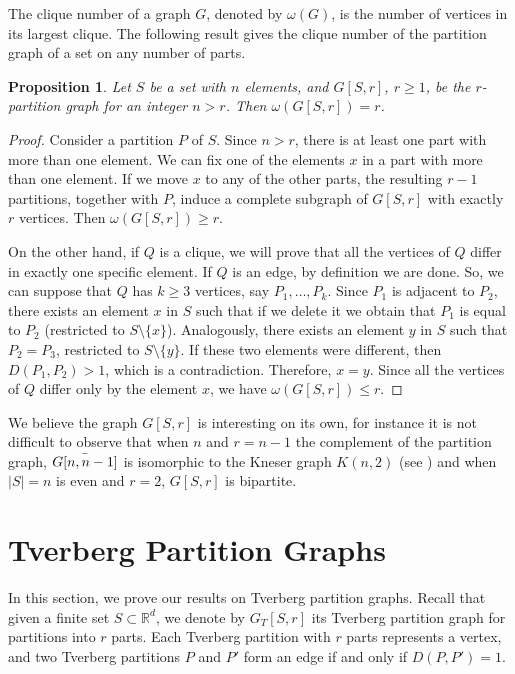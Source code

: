 \documentclass[11pt,a4paper]{article}
\theoremstyle{plain}
\newtheorem{proposition}{Proposition}
\theoremstyle{definition}
\newcommand{\rr}{\mathds{R}}
\begin{document}
The clique number of a graph $G$, denoted by $\omega(G)$, is the number of vertices in its largest clique. The following result gives the clique number of the partition graph of a set on any number of parts.

\begin{proposition}\label{cliquepartitiongraph}
Let $S$ be a set with $n$ elements, and $G[S,r]$, $r\geq 1$,  be the $r$-partition graph for an integer $n>r$. Then $\omega(G[S,r])=r$. 
\end{proposition}


\begin{proof}
Consider a partition $P$ of $S$.  Since $n> r$, there is at least one part with more than one element.  We can fix one of the elements $x$ in a part with more than one element.  If we move $x$ to any of the other parts, the resulting $r-1$ partitions, together with $P$, induce a complete subgraph of $G[S,r]$ with exactly $r$ vertices. Then $\omega(G[S,r])\geq r$. 

On the other hand, if $Q$ is a clique, we will prove that all the vertices of $Q$ differ in exactly one specific element.
If $Q$ is an edge, by definition we are done. So, we can suppose that $Q$ has $k\geq 3$ vertices, say $P_1,\dots ,P_k$. Since $P_1$ is adjacent to $P_2$, there exists an element $x$ in $S$ such that if we delete it we obtain that $P_1$ is equal to $P_2$ (restricted to $S\setminus \{x\}$). Analogously, there exists an element $y$ in $S$ such that $P_2=P_3$, restricted to $S\setminus \{y\}$. If these two elements were different, then $D(P_1,P_2)>1$, which is a contradiction. Therefore, $x=y$.  Since all the vertices of $Q$ differ only by the element $x$, we have $\omega(G[S,r])\leq r$.
\end{proof}

We believe the graph $G[S,r]$ is interesting on its own, for instance it is not difficult to observe that when $n$ and $r=n-1$ the complement of the partition graph,  $\Bar{G[n,n-1]}$ is isomorphic to the Kneser graph $K(n,2)$ (see \cite{Godsil2001}) and when $|S|=n$ is even and $r=2$, $G[S,r]$ is bipartite.      

\section{Tverberg Partition Graphs}\label{sec:tverberggraphs}

In this section, we prove our results on Tverberg partition graphs.  Recall that given a finite set $S \subset \rr^d$, we denote by $G_T[S,r]$ its Tverberg partition graph for partitions into $r$ parts.  Each Tverberg partition with $r$ parts represents a vertex, and two Tverberg partitions $P$ and $P'$ form an edge if and only if $D(P,P')=1$.
\end{document}
